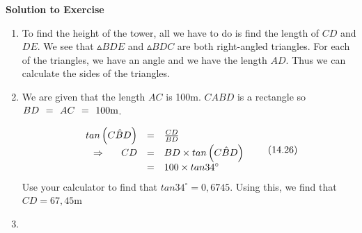{\begin{mdframed}[linewidth=4, leftmargin=40, rightmargin=40]
\begin{exercise}
        \par 
        \vspace{5pt}
        \label{m39411*solfhsst!!!underscore!!!id1394}\noindent\textbf{Solution to Exercise } \label{m39411*listfhsst!!!underscore!!!id1394}\begin{enumerate}[noitemsep, label=\textbf{Step} \textbf{\arabic*}. ] 
            \leftskip=20pt\rightskip=\leftskip\item  
        \label{m39411*id81976}To find the height of the tower, all we have to do is find the length of $CD$ and $DE$. We see that $▵BDE$ and $▵BDC$ are both right-angled triangles. For each of the triangles, we have an angle and we have the length $AD$. Thus we can calculate the sides of the triangles.\par 
        \item  
        \label{m39411*id82067}We are given that the length $AC$ is 100m. $CABD$ is a rectangle so $BD\phantom{\rule{4pt}{0ex}}=\phantom{\rule{4pt}{0ex}}AC\phantom{\rule{4pt}{0ex}}=\phantom{\rule{4pt}{0ex}}100\mathrm{m}$.\par 
        \label{m39411*id82138}\nopagebreak\noindent{}
          
    \begin{equation}
    \begin{array}{ccc}\hfill tan\left(C\hat{B}D\right)& =& \frac{CD}{BD}\hfill \\ \hfill \ensuremath{\Rightarrow}\phantom{\rule{4pt}{0ex}}\phantom{\rule{4pt}{0ex}}\phantom{\rule{4pt}{0ex}}\phantom{\rule{4pt}{0ex}}CD& =& BD\ensuremath{\times}tan\left(C\hat{B}D\right)\hfill \\ & =& 100\ensuremath{\times}tan{34}^{\circ }\hfill \end{array}\tag{14.26}
      \end{equation}
        \label{m39411*id82283}Use your calculator to find that $tan{34}^{\circ }=0,6745$. Using this, we find that $CD=67,45$m\par 
        \item  
        \label{m39411*id82354}\nopagebreak\noindent{}
          

\end{enumerate}
\end{exercise}
\end{mdframed}}
